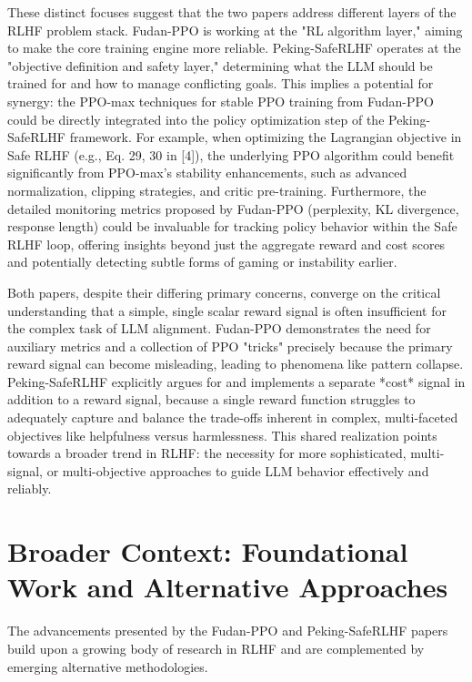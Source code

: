 \documentclass[10pt,journal,compsoc]{IEEEtran} %
\begin{document}
These distinct focuses suggest that the two papers address different layers of the RLHF problem stack. Fudan-PPO is working at the "RL algorithm layer," aiming to make the core training engine more reliable. Peking-SafeRLHF operates at the "objective definition and safety layer," determining what the LLM should be trained for and how to manage conflicting goals. This implies a potential for synergy: the PPO-max techniques for stable PPO training from Fudan-PPO could be directly integrated into the policy optimization step of the Peking-SafeRLHF framework. For example, when optimizing the Lagrangian objective in Safe RLHF (e.g., Eq. 29, 30 in [4]), the underlying PPO algorithm could benefit significantly from PPO-max's stability enhancements, such as advanced normalization, clipping strategies, and critic pre-training. Furthermore, the detailed monitoring metrics proposed by Fudan-PPO (perplexity, KL divergence, response length) could be invaluable for tracking policy behavior within the Safe RLHF loop, offering insights beyond just the aggregate reward and cost scores and potentially detecting subtle forms of gaming or instability earlier.

Both papers, despite their differing primary concerns, converge on the critical understanding that a simple, single scalar reward signal is often insufficient for the complex task of LLM alignment. Fudan-PPO demonstrates the need for auxiliary metrics and a collection of PPO "tricks" precisely because the primary reward signal can become misleading, leading to phenomena like pattern collapse. Peking-SafeRLHF explicitly argues for and implements a separate *cost* signal in addition to a reward signal, because a single reward function struggles to adequately capture and balance the trade-offs inherent in complex, multi-faceted objectives like helpfulness versus harmlessness. This shared realization points towards a broader trend in RLHF: the necessity for more sophisticated, multi-signal, or multi-objective approaches to guide LLM behavior effectively and reliably.

\section{Broader Context: Foundational Work and Alternative Approaches}
\label{sec:broader_context}

The advancements presented by the Fudan-PPO and Peking-SafeRLHF papers build upon a growing body of research in RLHF and are complemented by emerging alternative methodologies.
\end{document}
